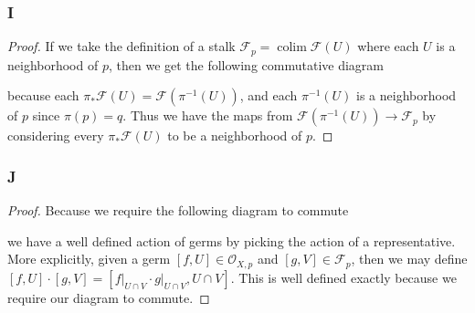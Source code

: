 \documentclass{article}
\newcommand{\fF}{\mathscr{F}}
\newcommand{\fO}{\mathscr{O}}
\DeclareMathOperator{\res}{\mathrm{res}}
\DeclareMathOperator{\colim}{\mathrm{colim}}
\begin{document}
\subsubsection{I}\label{2.2.I}
\begin{proof}
    If we take the definition of a stalk $\fF_p=\colim \fF(U)$ where each $U$ is a neighborhood of $p$, then we get the following commutative diagram
    \begin{center}
    \end{center}
    because each $\pi_* \fF(U)=\fF(\pi^{-1}(U))$, and each $\pi^{-1}(U)$ is a neighborhood of $p$ since $\pi(p)=q$. Thus we have the maps from $\fF(\pi^{-1}(U))\to \fF_p$ by considering every $\pi_*\fF(U)$ to be a neighborhood of $p$.
\end{proof}
\subsubsection{J}\label{2.2.J}
\begin{proof}
    Because we require the following diagram to commute
    \begin{center}
    \end{center}
    we have a well defined action of germs by picking the action of a representative. More explicitly, given a germ $[f,U]\in \fO_{X,p}$ and $[g,V] \in \fF_p$, then we may define $[f,U]\cdot [g,V]=[f\vert_{U\cap V}\cdot g\vert_{U\cap V},U\cap V]$. This is well defined exactly because we require our diagram to commute.
\end{proof}
\subsection{}
\end{document}
